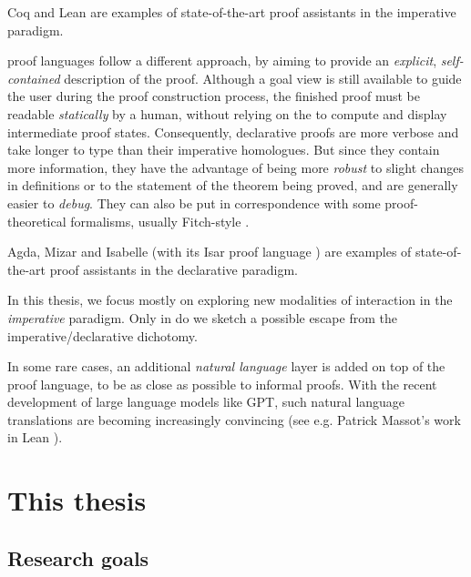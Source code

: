 \begin{description}[labelsep=0pt]
  Coq and Lean are examples of state-of-the-art proof assistants in the
  imperative paradigm.
  
  \item[Declarative~]proof languages follow a different approach, by
  aiming to provide an \emph{explicit}, \emph{self-contained} description of the
  proof. Although a goal view is still available to guide the user during the
  proof construction process, the finished proof must be readable
  \emph{statically} by a human, without relying on the  to compute and
  display intermediate proof states. Consequently, declarative proofs are more
  verbose and take longer to type than their imperative homologues. But since
  they contain more information, they have the advantage of being more
  \emph{robust} to slight changes in definitions or to the statement of the
  theorem being proved, and are generally easier to \emph{debug}. They can also
  be put in correspondence with some proof-theoretical formalisms, usually
  Fitch-style  \cite{geuvers_proof_2009}.
  
  Agda, Mizar and Isabelle (with its Isar proof language ) are
  examples of state-of-the-art proof assistants in the declarative paradigm.
\end{description}

\begin{emphpar}
  In this thesis, we focus mostly on exploring new modalities of interaction in
  the \emph{imperative} paradigm. Only in  do we
  sketch a possible escape from the imperative/declarative dichotomy.
\end{emphpar}

\begin{remark}
In some rare cases, an additional \emph{natural language} layer is added on top
of the proof language, to be as close as possible to informal proofs. With the
recent development of large language models like GPT, such natural language
translations are becoming increasingly convincing (see e.g. Patrick Massot's
work in Lean \cite{LeanIPAM}).
\end{remark}


\section{This thesis}

\subsection{Research goals}

